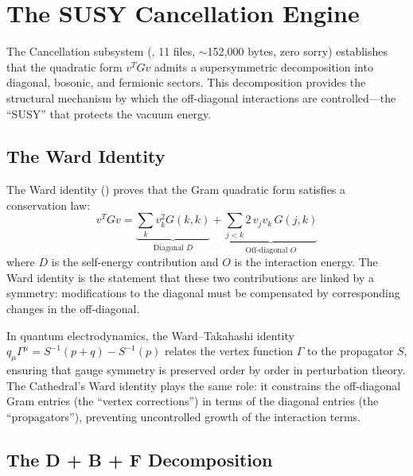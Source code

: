 \section{The SUSY Cancellation Engine}
\label{sec:susy}

The Cancellation subsystem (,
11 files, $\sim$152{,}000 bytes, zero sorry) establishes that the
quadratic form $v^T G v$ admits a supersymmetric decomposition into
diagonal, bosonic, and fermionic sectors. This decomposition provides
the structural mechanism by which the off-diagonal interactions are
controlled---the ``SUSY'' that protects the vacuum energy.

\subsection{The Ward Identity}

The Ward identity () proves that the Gram
quadratic form satisfies a conservation law:
\begin{equation}
  v^T G v = \underbrace{\sum_k v_k^2 G(k,k)}_{\text{Diagonal } D}
  + \underbrace{\sum_{j < k} 2\,v_j v_k\, G(j,k)}_{\text{Off-diagonal } O}
  \label{eq:ward}
\end{equation}
where $D$ is the self-energy contribution and $O$ is the interaction
energy. The Ward identity is the statement that these two contributions
are linked by a symmetry: modifications to the diagonal must be
compensated by corresponding changes in the off-diagonal.

\begin{correspondence}
In quantum electrodynamics, the Ward--Takahashi identity
$q_\mu \Gamma^\mu = S^{-1}(p + q) - S^{-1}(p)$
relates the vertex function $\Gamma$ to the propagator $S$,
ensuring that gauge symmetry is preserved order by order in
perturbation theory. The Cathedral's Ward identity plays the same
role: it constrains the off-diagonal Gram entries (the ``vertex
corrections'') in terms of the diagonal entries (the ``propagators''),
preventing uncontrolled growth of the interaction terms.
\end{correspondence}

\subsection{The D + B + F Decomposition}

